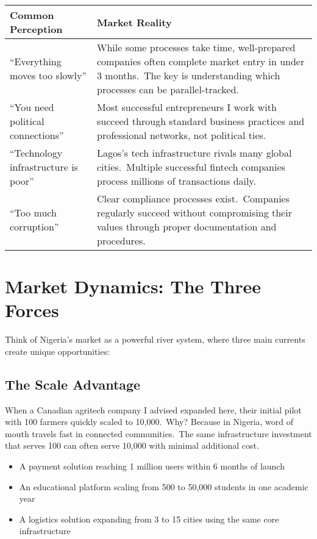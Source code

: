 \begin{center}
\begin{tabularx}{\textwidth}{>{\raggedright\arraybackslash}X >{\raggedright\arraybackslash}X}
    \toprule
    \textbf{Common Perception} & \textbf{Market Reality} \\
    \midrule
    ``Everything moves too slowly'' & While some processes take time, well-prepared companies often complete market entry in under 3 months.\ The key is understanding which processes can be parallel-tracked. \\
    \addlinespace
    ``You need political connections'' & Most successful entrepreneurs I work with succeed through standard business practices and professional networks, not political ties. \\
    \addlinespace
    ``Technology infrastructure is poor'' & Lagos's tech infrastructure rivals many global cities.\ Multiple successful fintech companies process millions of transactions daily. \\
    \addlinespace
    ``Too much corruption'' & Clear compliance processes exist.\ Companies regularly succeed without compromising their values through proper documentation and procedures. \\
    \bottomrule
\end{tabularx}
\end{center}

\section{Market Dynamics: The Three Forces}\label{sec:market-dynamics:-the-three-forces}

Think of Nigeria's market as a powerful river system, where three main currents create unique opportunities:

\subsection{The Scale Advantage}\label{subsec:the-scale-advantage}
When a Canadian agritech company I advised expanded here, their initial pilot with 100 farmers quickly scaled to 10,000.\ Why?
Because in Nigeria, word of mouth travels fast in connected communities.\ The same infrastructure investment that serves 100 can often serve 10,000 with minimal additional cost.

\begin{tcolorbox}[colback=white,colframe=primarydark,title=\textbf{Scale Impact Examples}]
\begin{itemize}
    \item A payment solution reaching 1 million users within 6 months of launch
    \item An educational platform scaling from 500 to 50,000 students in one academic year
    \item A logistics solution expanding from 3 to 15 cities using the same core infrastructure
\end{itemize}
\end{tcolorbox}

